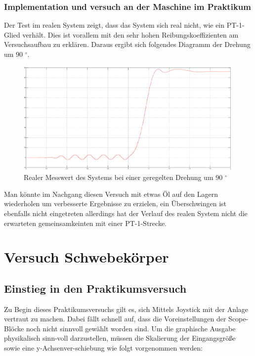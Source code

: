 \documentclass[10pt]{scrartcl}
\begin{document}
\subsubsection{Implementation und versuch an der Maschine im Praktikum}
Der Test im realen System zeigt, dass das System sich real nicht, wie ein PT-1-Glied verhält. Dies ist vorallem mit den sehr hohen Reibungskoeffizienten am Versuchsaufbau zu erklären. Daraus ergibt sich folgendes Diagramm der Drehung um 90 $^\circ$.
\begin{figure}[H]
	\centering
	\includegraphics[width=1.2\textwidth]{Drehzahl57B.png}
	\caption{Realer Messwert des Systems bei einer geregelten Drehung um 90 $^\circ$}
	\label{img:grafik-dummy}
\end{figure}
Man könnte im Nachgang diesen Versuch mit etwas Öl auf den Lagern wiederholen um verbesserte Ergebnisse zu erzielen, ein Überschwingen ist ebenfalls nicht eingetreten allerdings hat der Verlauf des realen System nicht die erwarteten gemeinsamkeinten mit einer PT-1-Strecke.
\newpage



\section{Versuch Schwebekörper}


\subsection{Einstieg in den Praktikumsversuch}
Zu Begin dieses Praktikumsversuchs gilt es, sich Mittels Joystick mit der Anlage vertraut zu machen. Dabei fällt schnell auf, dass die Voreinstellungen der Scope-Blöcke noch nicht sinnvoll gewählt worden sind. Um die graphische Ausgabe physikalisch sinn-voll darzustellen, müssen die Skalierung der Eingangsgröße sowie eine y-Achsenver-schiebung wie folgt vorgenommen werden:
\end{document}
